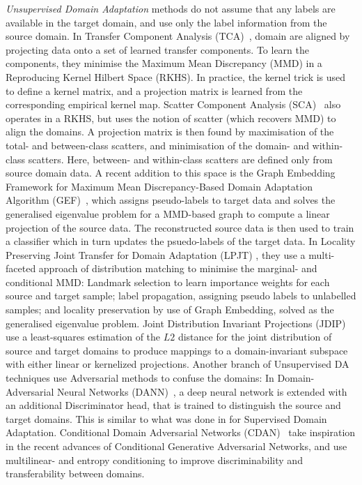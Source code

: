 \documentclass[journal]{IEEEtran}
\begin{document}
\textit{Unsupervised Domain Adaptation} methods do not assume that any labels are available in the target domain, and use only the label information from the source domain. 
In Transfer Component Analysis (TCA)~\cite{pan2010tca}, domain are aligned by projecting data onto a set of learned transfer components. To learn the components, they minimise the Maximum Mean Discrepancy (MMD) in a Reproducing Kernel Hilbert Space (RKHS). In practice, the kernel trick is used to define a kernel matrix, and a projection matrix is learned from the corresponding empirical kernel map.
Scatter Component Analysis (SCA)~\cite{ghifary2017sca} also operates in a RKHS, but uses the notion of scatter (which recovers MMD) to align the domains. A projection matrix is then found by maximisation of the total- and between-class scatters, and minimisation of the domain- and within-class scatters. Here, between- and within-class scatters are defined only from source domain data.
A recent addition to this space is the Graph Embedding Framework for Maximum Mean Discrepancy-Based Domain Adaptation Algorithm (GEF)~\cite{chen2019gef}, which assigns pseudo-labels to target data and solves the generalised eigenvalue problem for a MMD-based graph to compute a linear projection of the source data. The reconstructed source data is then used to train a classifier which in turn updates the psuedo-labels of the target data. 
In Locality Preserving Joint Transfer for Domain Adaptation (LPJT) \cite{li2019locality}, they use a multi-faceted approach of distribution matching to minimise the marginal- and conditional MMD: Landmark selection to learn importance weights for each source and target sample; label propagation, assigning pseudo labels to unlabelled samples; and locality preservation by use of Graph Embedding, solved as the generalised eigenvalue problem.
Joint Distribution Invariant Projections (JDIP) \cite{chen2020domain} use a least-squares estimation of the $L2$ distance for the joint distribution of source and target domains to produce mappings to a domain-invariant subspace with either linear or kernelized projections.
Another branch of Unsupervised DA techniques use Adversarial methods to confuse the domains: In Domain-Adversarial Neural Networks (DANN)~\cite{ganin2016domain}, a deep neural network is extended with an additional Discriminator head, that is trained to distinguish the source and target domains. This is similar to what was done in \cite{tzeng2015simultaneous} for Supervised Domain Adaptation. 
Conditional Domain Adversarial Networks (CDAN)~\cite{long2018conditional} take inspiration in the recent advances of Conditional Generative Adversarial Networks, and use multilinear- and entropy conditioning to improve discriminability and transferability between domains.
\end{document}
